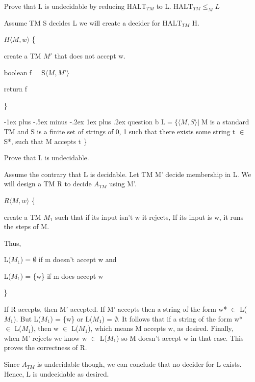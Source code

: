 \documentclass[10pt,landscape]{article}
\makeatletter
\renewcommand{\subsubsection}{\@startsection{subsubsection}{3}{0mm}%
                                {-1ex plus -.5ex minus -.2ex}%
                                {1ex plus .2ex}%
                                {\normalfont\small\bfseries}}
\makeatother
\begin{document}
\begin{multicols}{3}
Prove that L is undecidable by reducing $\mathrm{HALT}_{TM}$ to L.
$\mathrm{HALT}_{TM} \leq_M L$

Assume TM S decides L we will create a decider for $\mathrm{HALT}_{TM}$ H.

\begin{algorithm}[H]
 $H \langle{ M, w \rangle}$ \{

 create a TM $M'$ that does not accept w.

 boolean f = S$\langle{ M, M' \rangle}$
 
 return f

 \}
\end{algorithm}

\subsubsection{question b}
$\mathrm{L} = \{ \langle{ M, S \rangle} | $ M is a standard TM and S is a finite set of strings of {0, 1} such that there exists some string t $\in$ S*, such that M accepts t  \}

Prove that L is undecidable.

Assume the contrary that L is decidable. Let TM M' decide membership in L. We will design a TM R to decide $A_{TM}$ using M'.

\begin{algorithm}[H]
 $R \langle{ M, w \rangle}$ \{

 create a TM $M_1$ such that if its input isn't w it rejects, If its input is w, it runs the steps of M.

 Thus, 

 L($M_1$) = $\emptyset$ if m doesn't accept w and

 L($M_1$) = \{w\} if m does accept w 

 \}
\end{algorithm}

If R accepts, then M' accepted. If M' accepts then a string of the form w* $\in$ L($M_1$). But L($M_1$) = \{w\} or L($M_1$) = $\emptyset$. It follows that if a string of the form w* $\in$ L($M_1$), then w $\in$ L($M_1$), which means M accepts w, as desired. Finally, when M' rejects we know w $\in$ L($M_1$) so M doesn't accept w in that case. This proves the correctness of R.

Since $A_{TM}$ is undecidable though, we can conclude that no decider for L exists. Hence, L is undecidable as desired. 




\end{multicols}
\end{document}
